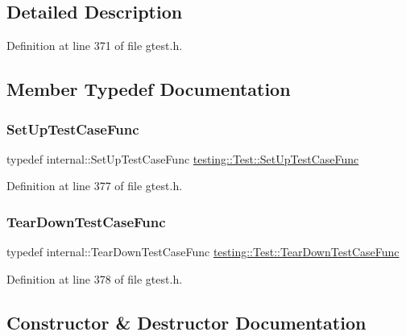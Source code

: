\subsection{Detailed Description}


Definition at line 371 of file gtest.\+h.



\subsection{Member Typedef Documentation}
\mbox{\label{classtesting_1_1Test_a5f2a051d1d99c9b784c666c586186cf9}} 
\subsubsection{\texorpdfstring{Set\+Up\+Test\+Case\+Func}{SetUpTestCaseFunc}}
{\footnotesize\ttfamily typedef internal\+::\+Set\+Up\+Test\+Case\+Func \hyperlink{classtesting_1_1Test_a5f2a051d1d99c9b784c666c586186cf9}{testing\+::\+Test\+::\+Set\+Up\+Test\+Case\+Func}}



Definition at line 377 of file gtest.\+h.

\mbox{\label{classtesting_1_1Test_aa0f532e93b9f3500144c53f31466976c}} 
\subsubsection{\texorpdfstring{Tear\+Down\+Test\+Case\+Func}{TearDownTestCaseFunc}}
{\footnotesize\ttfamily typedef internal\+::\+Tear\+Down\+Test\+Case\+Func \hyperlink{classtesting_1_1Test_aa0f532e93b9f3500144c53f31466976c}{testing\+::\+Test\+::\+Tear\+Down\+Test\+Case\+Func}}



Definition at line 378 of file gtest.\+h.



\subsection{Constructor \& Destructor Documentation}
\mbox{\label{classtesting_1_1Test_afc75dfea37533866035b0d97cd11483e}} 
